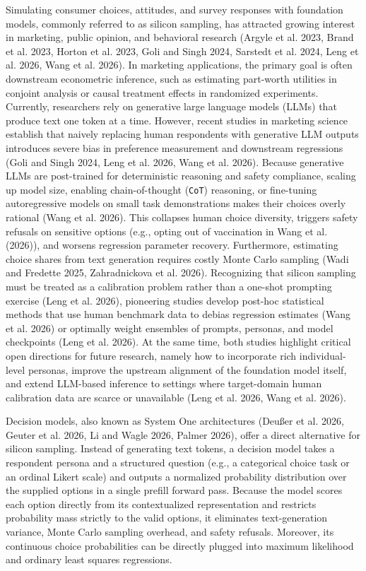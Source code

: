 \documentclass[
  letterpaper,
  DIV=11,
  numbers=noendperiod]{scrartcl}
\begin{document}
Simulating consumer choices, attitudes, and survey responses with
foundation models, commonly referred to as silicon sampling, has
attracted growing interest in marketing, public opinion, and behavioral
research (Argyle et al. 2023, Brand et al. 2023, Horton et al. 2023,
Goli and Singh 2024, Sarstedt et al. 2024, Leng et al. 2026, Wang et al.
2026). In marketing applications, the primary goal is often downstream
econometric inference, such as estimating part-worth utilities in
conjoint analysis or causal treatment effects in randomized experiments.
Currently, researchers rely on generative large language models (LLMs)
that produce text one token at a time. However, recent studies in
marketing science establish that naively replacing human respondents
with generative LLM outputs introduces severe bias in preference
measurement and downstream regressions (Goli and Singh 2024, Leng et al.
2026, Wang et al. 2026). Because generative LLMs are post-trained for
deterministic reasoning and safety compliance, scaling up model size,
enabling chain-of-thought (\texttt{CoT}) reasoning, or fine-tuning
autoregressive models on small task demonstrations makes their choices
overly rational (Wang et al. 2026). This collapses human choice
diversity, triggers safety refusals on sensitive options (e.g., opting
out of vaccination in Wang et al. (2026)), and worsens regression
parameter recovery. Furthermore, estimating choice shares from text
generation requires costly Monte Carlo sampling (Wadi and Fredette 2025,
Zahradnickova et al. 2026). Recognizing that silicon sampling must be
treated as a calibration problem rather than a one-shot prompting
exercise (Leng et al. 2026), pioneering studies develop post-hoc
statistical methods that use human benchmark data to debias regression
estimates (Wang et al. 2026) or optimally weight ensembles of prompts,
personas, and model checkpoints (Leng et al. 2026). At the same time,
both studies highlight critical open directions for future research,
namely how to incorporate rich individual-level personas, improve the
upstream alignment of the foundation model itself, and extend LLM-based
inference to settings where target-domain human calibration data are
scarce or unavailable (Leng et al. 2026, Wang et al. 2026).

Decision models, also known as System One architectures (Deußer et al.
2026, Geuter et al. 2026, Li and Wagle 2026, Palmer 2026), offer a
direct alternative for silicon sampling. Instead of generating text
tokens, a decision model takes a respondent persona and a structured
question (e.g., a categorical choice task or an ordinal Likert scale)
and outputs a normalized probability distribution over the supplied
options in a single prefill forward pass. Because the model scores each
option directly from its contextualized representation and restricts
probability mass strictly to the valid options, it eliminates
text-generation variance, Monte Carlo sampling overhead, and safety
refusals. Moreover, its continuous choice probabilities can be directly
plugged into maximum likelihood and ordinary least squares regressions.
\end{document}
